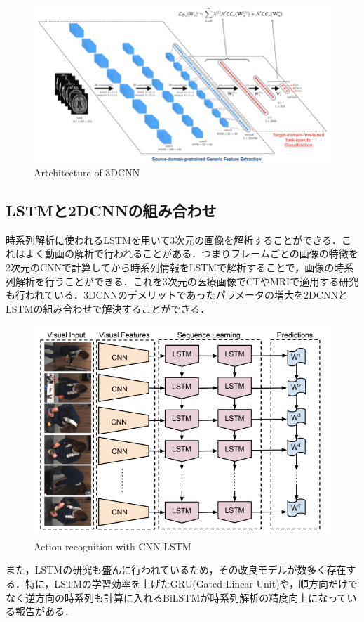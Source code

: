 \begin{figure}[H]
	\centering
	\includegraphics[width=0.7\linewidth]{fig/3d_cnn.png}
	\caption{Artchitecture of 3DCNN\cite{Hosseini-AslGE16}}
	\label{fig:3DCNN}
\end{figure}


\subsection{LSTMと2DCNNの組み合わせ}
時系列解析に使われるLSTMを用いて3次元の画像を解析することができる．これはよく動画の解析で行われることがある．つまりフレームごとの画像の特徴を2次元のCNNで計算してから時系列情報をLSTMで解析することで，画像の時系列解析を行うことができる．これを3次元の医療画像でCTやMRIで適用する研究も行われている．3DCNNのデメリットであったパラメータの増大を2DCNNとLSTMの組み合わせで解決することができる\cite{Donahue_2015_CVPR}．

\begin{figure}[H]
	\centering
	\includegraphics[width=0.7\linewidth]{fig/chapter2/cnn_lstm}
	\caption{Action recognition with CNN-LSTM\cite{Donahue_2015_CVPR}}
	\label{fig:cnnlstm}
\end{figure}

また，LSTMの研究も盛んに行われているため，その改良モデルが数多く存在する．特に，LSTMの学習効率を上げたGRU(Gated Linear Unit)\cite{cho2014learning}や，順方向だけでなく逆方向の時系列も計算に入れるBiLSTM\cite{wang2016image}が時系列解析の精度向上になっている報告がある．


